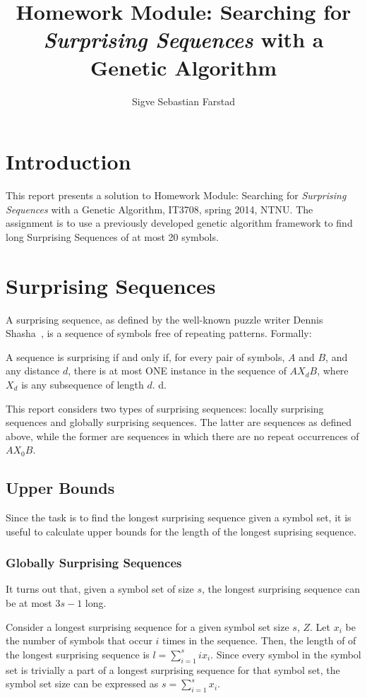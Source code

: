 \documentclass{article}
\title{Homework Module: \textbf{Searching for \textit{Surprising Sequences} with a Genetic Algorithm}}
\author{Sigve Sebastian Farstad}
\begin{document}
\maketitle

\section{Introduction}

This report presents a solution to Homework Module: Searching for \textit{Surprising Sequences} with a Genetic Algorithm, IT3708, spring 2014, NTNU.
The assignment is to use a previously developed genetic algorithm framework to find long Surprising Sequences of at most 20 symbols.

\section{Surprising Sequences}

A surprising sequence, as defined by the well-known puzzle writer Dennis Shasha~\cite{ea-surprisers}, is a sequence of symbols free of repeating patterns. Formally:

A sequence is surprising if and only if, for every pair of symbols, $ A $ and $ B $, and any distance $ d $, there is at most ONE instance in the sequence of $ AX_dB$, where $ X_d $ is any subsequence of length $ d $.\cite{ea-surprisers}
d.

This report considers two types of surprising sequences: locally surprising sequences and globally surprising sequences.
The latter are sequences as defined above, while the former are sequences in which there are no repeat occurrences of $ AX_0B $.

\subsection{Upper Bounds}
Since the task is to find the longest surprising sequence given a symbol set, it is useful to calculate upper bounds for the length of the longest suprising sequence.

\subsubsection{Globally Surprising Sequences}

It turns out that, given a symbol set of size $ s $, the longest surprising sequence can be at most $ 3s - 1 $ long.

Consider a longest surprising sequence for a given symbol set size $ s $, $ Z $.
Let $ x_i $ be the number of symbols that occur $ i $ times in the sequence.
Then, the length of of the longest surprising sequence is $ l = \sum_{i=1}^{s} i x_i $.
Since every symbol in the symbol set is trivially a part of a longest surprising sequence for that symbol set, the symbol set size can be expressed as $ s = \sum_{i=1}^{s} x_i $.
\end{document}

